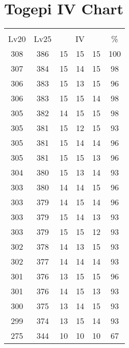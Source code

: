 \documentclass{article}%
\begin{document}
%
\normalsize%
\section{Togepi IV Chart}%
\label{sec:Togepi IV Chart}%
\renewcommand{\arraystretch}{1.5}%
\begin{tabular}{|c|c|c|c|c|c|}%
\hline%
\multicolumn{6}{|c|}{\textcolor{white}{ 
\linebreak{Togepi}
}%
\cellcolor{black}}\\%
\multicolumn{1}{|c}{Lv20}&\multicolumn{1}{c|}{Lv25}&\multicolumn{3}{c|}{IV}&\multicolumn{1}{|c|}{\%}\\%
\hline%
\rowcolor{color100}%
308&386&15&15&15&100\\%
\hline%
\rowcolor{color98}%
307&384&15&14&15&98\\%
\hline%
\rowcolor{color96}%
306&383&15&13&15&96\\%
\hline%
\rowcolor{color98}%
306&383&15&15&14&98\\%
\hline%
\rowcolor{color98}%
305&382&14&15&15&98\\%
\hline%
\rowcolor{color93}%
305&381&15&12&15&93\\%
\hline%
\rowcolor{color96}%
305&381&15&14&14&96\\%
\hline%
\rowcolor{color96}%
305&381&15&15&13&96\\%
\hline%
\rowcolor{color93}%
304&380&15&13&14&93\\%
\hline%
\rowcolor{color96}%
303&380&14&14&15&96\\%
\hline%
\rowcolor{color96}%
303&379&14&15&14&96\\%
\hline%
\rowcolor{color93}%
303&379&15&14&13&93\\%
\hline%
\rowcolor{color93}%
303&379&15&15&12&93\\%
\hline%
\rowcolor{color93}%
302&378&14&13&15&93\\%
\hline%
\rowcolor{color93}%
302&377&14&14&14&93\\%
\hline%
\rowcolor{color96}%
301&376&13&15&15&96\\%
\hline%
\rowcolor{color93}%
301&376&14&15&13&93\\%
\hline%
\rowcolor{color93}%
300&375&13&14&15&93\\%
\hline%
\rowcolor{color93}%
299&374&13&15&14&93\\%
\hline%
\rowcolor{color91}%
275&344&10&10&10&67\\%
\end{tabular}

%
\end{document}
